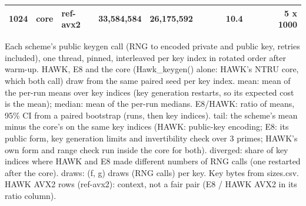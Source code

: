 \begin{table}[t]
{\begin{tabular}{rllrrlrrrrrr}
1024 & core & ref-avx2 & 33{,}584{,}584 & 26{,}175{,}592 &  &  &  & 10.4 &  &  & 5 x 1000 \\
\bottomrule
\end{tabular}}
\par\smallskip\parbox{\linewidth}{\scriptsize Each scheme's public keygen call (RNG to encoded private and public key, retries included), one thread, pinned, interleaved per key index in rotated order after warm-up. HAWK, E8 and the core (Hawk\_keygen() alone: HAWK's NTRU core, which both call) draw from the same paired seed per key index. mean: mean of the per-run means over key indices (key generation restarts, so its expected cost is the mean); median: mean of the per-run medians. E8/HAWK: ratio of means, 95\% CI from a paired bootstrap (runs, then key indices). tail: the scheme's mean minus the core's on the same key indices (HAWK: public-key encoding; E8: its public form, key generation limits and invertibility check over 3 primes; HAWK's own form and range check run inside the core for both). diverged: share of key indices where HAWK and E8 made different numbers of RNG calls (one restarted after the core). draws: (f, g) draws (RNG calls) per key. Key bytes from sizes.csv. HAWK AVX2 rows (ref-avx2): context, not a fair pair (E8 / HAWK AVX2 in its ratio column).}
\end{table}

